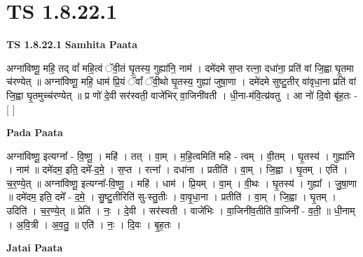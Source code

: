 \documentclass[17pt]{extarticle}
\begin{document}
\section*{ TS 1.8.22.1 }

\textbf{TS 1.8.22.1 } \newline
\textbf{Samhita Paata} \newline

अग्ना॑विष्णू॒ महि॒ तद् वां᳚ महि॒त्वं ॅवी॒तं घृ॒तस्य॒ गुह्या॑नि॒ नाम॑ । दमे॑दमे स॒प्त रत्ना॒ दधा॑ना॒ प्रति॑ वां जि॒ह्वा घृ॒तमा च॑रण्येत् ॥ अग्ना॑विष्णू॒ महि॒ धाम॑ प्रि॒यं ॅवां᳚ ॅवी॒थो घृ॒तस्य॒ गुह्या॑ जुषा॒णा । दमे॑दमे सुष्टु॒तीर् वा॑वृधा॒ना प्रति॑ वां जि॒ह्वा घृ॒तमुच्च॑रण्येत् ॥ प्र णो॑ दे॒वी सर॑स्वती॒ वाजे॑भिर् वा॒जिनी॑वती । धी॒ना-म॑वि॒त्य्र॑वतु । आ नो॑ दि॒वो बृ॑ह॒तः - [ ] \newline

\textbf{Pada Paata} \newline

अग्ना॑विष्णू॒ इत्यग्ना᳚ - वि॒ष्णू॒ । महि॑ । तत् । वा॒म् । म॒हि॒त्वमिति॑ महि - त्वम् । वी॒तम् । घृ॒तस्य॑ । गुह्या॑नि । नाम॑ ॥ दमे॑दम॒ इति॒ दमे᳚-द॒मे॒ । स॒प्त । रत्ना᳚ । दधा॑ना । प्रतीति॑ । वा॒म् । जि॒ह्वा । घृ॒तम् । एति॑ । च॒र॒ण्ये॒त् ॥ अग्ना॑विष्णू॒ इत्यग्ना᳚-वि॒ष्णू॒ । महि॑ । धाम॑ । प्रि॒यम् । वा॒म् । वी॒थः । घृ॒तस्य॑ । गुह्या᳚ । जु॒षा॒णा ॥ दमे॑दम॒ इति॒ दमे᳚ - द॒मे॒ । सु॒ष्टु॒तीरिति॑ सु-स्तु॒तीः । वा॒वृ॒धा॒ना । प्रतीति॑ । वा॒म् । जि॒ह्वा । घृ॒तम् । उदिति॑ । च॒र॒ण्ये॒त् ॥ प्रेति॑ । नः॒ । दे॒वी । सर॑स्वती । वाजे॑भिः । वा॒जिनी॑व॒तीति॑ वा॒जिनी᳚ - व॒ती॒ ॥ धी॒नाम् । अ॒वि॒त्री । अ॒व॒तु॒ ॥ एति॑ । नः॒ । दि॒वः । बृ॒ह॒तः ।  \newline



\textbf{Jatai Paata} \newline
\end{document}
